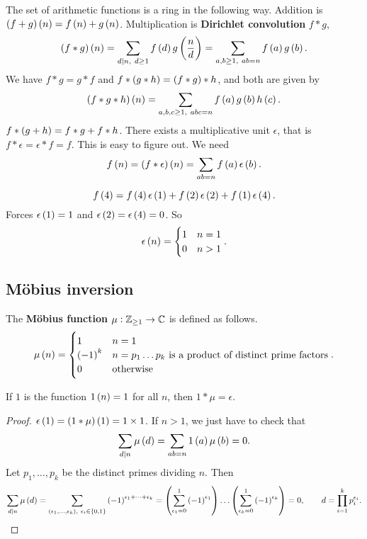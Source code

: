 The set of arithmetic functions is a ring in the following way. Addition is $ \br{f + g}\br{n} = f\br{n} + g\br{n} $. Multiplication is \textbf{Dirichlet convolution} $ f * g $,
$$ \br{f * g}\br{n} = \sum_{d \mid n, \ d \ge 1} f\br{d}g\br{\dfrac{n}{d}} = \sum_{a, b \ge 1, \ ab = n} f\br{a}g\br{b}. $$
We have $ f * g = g * f $ and $ f * \br{g * h} = \br{f * g} * h $, and both are given by
$$ \br{f * g * h}\br{n} = \sum_{a, b, c \ge 1, \ abc = n} f\br{a}g\br{b}h\br{c}. $$
$ f * \br{g + h} = f * g + f * h $. There exists a multiplicative unit $ \epsilon $, that is $ f * \epsilon = \epsilon * f = f $. This is easy to figure out. We need
$$ f\br{n} = \br{f * \epsilon}\br{n} = \sum_{ab = n} f\br{a}\epsilon\br{b}. $$

\begin{example*}
$$ f\br{4} = f\br{4}\epsilon\br{1} + f\br{2}\epsilon\br{2} + f\br{1}\epsilon\br{4}. $$
Forces $ \epsilon\br{1} = 1 $ and $ \epsilon\br{2} = \epsilon\br{4} = 0 $. So
$$ \epsilon\br{n} =
\begin{cases}
1 & n = 1 \\
0 & n > 1
\end{cases}.
$$
\end{example*}

\subsection{M\"obius inversion}

The \textbf{M\"obius function} $ \mu : \mathbb{Z}_{\ge 1} \to \mathbb{C} $ is defined as follows.
$$ \mu\br{n} =
\begin{cases}
1 & n = 1 \\
\br{-1}^k & n = p_1 \dots p_k \ \text{is a product of distinct prime factors} \\
0 & \text{otherwise}
\end{cases}.
$$

\begin{lemma}
\label{lem:103}
If $ 1 $ is the function $ 1\br{n} = 1 $ for all $ n $, then $ 1 * \mu = \epsilon $.
\end{lemma}

\begin{proof}
$ \epsilon\br{1} = \br{1 * \mu}\br{1} = 1 \times 1 $. If $ n > 1 $, we just have to check that
$$ \sum_{d \mid n} \mu\br{d} = \sum_{ab = n} 1\br{a}\mu\br{b} = 0. $$
Let $ p_1, \dots, p_k $ be the distinct primes dividing $ n $. Then
$$ \sum_{d \mid n} \mu\br{d} = \sum_{\br{\epsilon_1, \dots, \epsilon_k}, \ \epsilon_i \in \cbr{0, 1}} \br{-1}^{\epsilon_1 + \dots + \epsilon_k} = \br{\sum_{\epsilon_1 = 0}^1 \br{-1}^{\epsilon_1}} \dots \br{\sum_{\epsilon_k = 0}^1 \br{-1}^{\epsilon_k}} = 0, \qquad d = \prod_{i = 1}^k p_i^{\epsilon_i}. $$
\end{proof}

